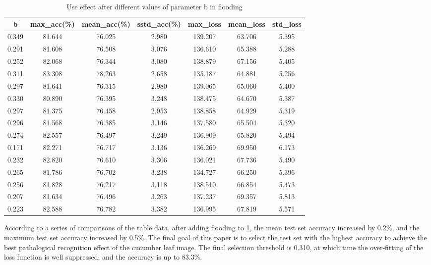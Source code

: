 \documentclass[a4paper,fleqn]{cas-sc}
\begin{document}
\begin{table}
\centering
\caption{Use effect after different values of parameter b in flooding}
\label{tab:mbv4}
\begin{tabular}{ccccccc}
\hline 
b & max\_acc(\%) & mean\_acc(\%) & sstd\_acc(\%) & max\_loss & mean\_loss & std\_loss \\
\hline  
0.349   & 81.644 &  76.025  & 2.980 &  139.207  & 63.706 & 5.395 \\
 0.291   & 81.608  & 76.508 & 3.076 &  136.610  & 65.388 & 5.288 \\
 0.252   & 82.068   & 76.344 & 3.080 &  138.879  & 67.156 & 5.405 \\
 0.311  & 83.308   & 78.263 & 2.658 &  135.187  & 64.881 & 5.256 \\
 0.297  &  81.641  & 76.315 & 2.980 &  139.065  & 65.060 & 5.400 \\
 0.330  & 80.890  & 76.395 & 3.248 & 138.475   & 64.670 & 5.387 \\
 0.297  & 81.375  & 76.458 &    2.953  & 138.858 & 64.929&5.319 \\
 0.296  & 81.568  & 76.385 & 3.146 &  137.580  & 65.504 & 5.320 \\
 0.274  & 82.557 &  76.497  & 3.249 &  136.909  & 65.820 & 5.494 \\
 0.171   & 82.271  & 76.717 & 3.136 &  136.269  & 69.950 & 6.173 \\
 0.232   & 82.820   & 76.610 & 3.306 &  136.021  & 67.736 & 5.490 \\
 0.265  & 81.786   & 76.702 & 3.238 &  134.727  & 66.250 & 5.396 \\
 0.256  &  81.828  & 76.217 & 3.118 &  138.510  & 66.854 & 5.473 \\
 0.207  & 81.634  & 76.496 & 3.263 &  137.237  & 69.357 & 5.813 \\
 0.223  & 82.588  & 76.782 & 3.382 &  136.995  & 67.819 & 5.571 \\
\hline
\end{tabular}
\end{table}

According to a series of comparisons of the table data, after adding flooding to \ref{tab:mbv4}, the mean test set accuracy increased by 0.2\%, and the maximum test set accuracy increased by 0.5\%. The final goal of this paper is to select the test set with the highest accuracy to achieve the best pathological recognition effect of the cucumber leaf image. The final selection threshold is 0.310, at which time the over-fitting of the loss function is well suppressed, and the accuracy is up to 83.3\%.
\end{document}
